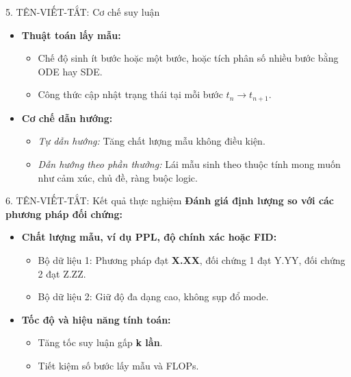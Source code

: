 \begin{frame}{5. TÊN-VIẾT-TẮT: Cơ chế suy luận}
    \begin{itemize}
        \item \textbf{Thuật toán lấy mẫu:}
        \begin{itemize}
            \item Chế độ sinh ít bước hoặc một bước, hoặc tích phân số nhiều bước bằng ODE hay SDE.
            \item Công thức cập nhật trạng thái tại mỗi bước $t_n \to t_{n+1}$.
        \end{itemize}
        \item \textbf{Cơ chế dẫn hướng:}
        \begin{itemize}
            \item \textit{Tự dẫn hướng:} Tăng chất lượng mẫu không điều kiện.
            \item \textit{Dẫn hướng theo phần thưởng:} Lái mẫu sinh theo thuộc tính mong muốn như cảm xúc, chủ đề, ràng buộc logic.
        \end{itemize}
    \end{itemize}
\end{frame}

\begin{frame}{6. TÊN-VIẾT-TẮT: Kết quả thực nghiệm}
    \textbf{Đánh giá định lượng so với các phương pháp đối chứng:}
    \begin{itemize}
        \item \textbf{Chất lượng mẫu, ví dụ PPL, độ chính xác hoặc FID:}
        \begin{itemize}
            \item Bộ dữ liệu 1: Phương pháp đạt \textbf{X.XX}, đối chứng 1 đạt Y.YY, đối chứng 2 đạt Z.ZZ.
            \item Bộ dữ liệu 2: Giữ độ đa dạng cao, không sụp đổ mode.
        \end{itemize}
        \item \textbf{Tốc độ và hiệu năng tính toán:}
        \begin{itemize}
            \item Tăng tốc suy luận gấp \textbf{k lần}.
            \item Tiết kiệm số bước lấy mẫu và FLOPs.
        \end{itemize}
    \end{itemize}
\end{frame}

